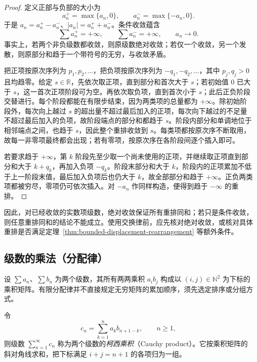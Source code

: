 \documentclass[UTF8,12pt,a4paper,fontset=fandol]{ctexbook}
\begin{document}
\begin{proof}
定义正部与负部的大小为
\[
    a_n^+=\max\{a_n,0\},\qquad a_n^-=\max\{-a_n,0\}.
\]
于是 $a_n=a_n^+-a_n^-$、$|a_n|=a_n^++a_n^-$。条件收敛蕴含
\begin{equation}
    \sum a_n^+=+\infty,\qquad \sum a_n^-=+\infty,
    \qquad a_n\to0.
    \label{eq:conditional-series-positive-negative-parts}
\end{equation}
事实上，若两个非负级数都收敛，则原级数绝对收敛；若仅一个收敛，另一个发散，则原部分和趋于一个带符号的无穷，与收敛矛盾。

把正项按原次序列为 $p_1,p_2,\ldots$，把负项按原次序列为 $-q_1,-q_2,\ldots$，其中 $p_j,q_j>0$ 且均趋零。给定 $s\in\mathbb R$，先依次取正项，直到部分和首次大于 $s$；若初始值 $0$ 已大于 $s$，这一首次正项阶段可为空。再依次取负项，直到首次小于 $s$；此后正负阶段交替进行。每个阶段都能在有限步结束，因为两类项的总量都为 $+\infty$。除初始阶段外，每次向上越过 $s$ 的超出量不超过最后加入的正项，每次向下越过的不足量不超过最后加入的负项，故阶段端点的部分和都趋于 $s$。阶段内部分和单调地位于相邻端点之间，也趋于 $s$，因此整个重排收敛到 $s$。每类项都按原次序不断取用，故每一非零项最终都会出现；若有零项，按原次序在各阶段间逐个插入即可。

若要求趋于 $+\infty$，第 $k$ 阶段先至少取一个尚未使用的正项，并继续取正项直到部分和大于 $k+q_k$，再加入负项 $-q_k$。阶段末部分和大于 $k$，阶段内的正项累加不低于上一阶段末值，最后加入负项后也仍大于 $k$，故全部部分和趋于 $+\infty$。正负两类项都被穷尽，零项仍可依次插入。对 $-a_n$ 作同样构造，便得到趋于 $-\infty$ 的重排。
\end{proof}

因此，对已经收敛的实数项级数，绝对收敛保证所有重排同和；若只是条件收敛，则任意重排同和的结论不能成立。使用交换律前，应先核对绝对收敛，或核对具体重排是否满足定理~\ref{thm:bounded-displacement-rearrangement} 等额外条件。

\subsection{级数的乘法（分配律）}
\label{subsec:multiplication-and-distributivity-of-series}

设 $\sum a_n$、$\sum b_n$ 为两个级数，其所有两两乘积 $a_ib_j$ 构成以 $(i,j)\in\mathbb N^2$ 为下标的乘积矩阵。有限分配律并不直接规定无穷矩阵的累加顺序，须先选定排序或分组方式。

\begin{definition}
令
\begin{equation}
    c_n=\sum_{k=1}^n a_kb_{n+1-k},\qquad n\geq1,
    \label{eq:cauchy-product-coefficients}
\end{equation}
则级数 $\sum_{n=1}^{\infty}c_n$ 称为两个级数的\emph{柯西乘积}（Cauchy product）。它按乘积矩阵的斜对角线求和，把下标满足 $i+j=n+1$ 的各项归为一组。
\end{definition}
\end{document}
